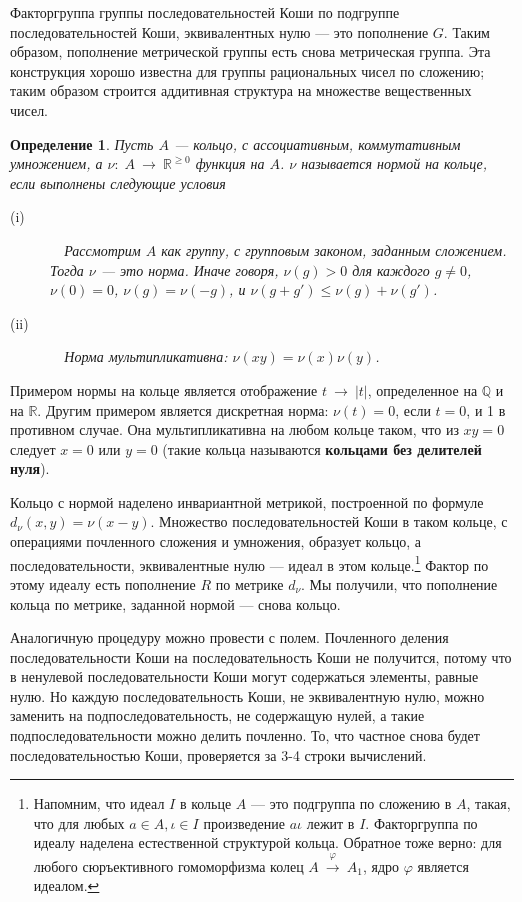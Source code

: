 \documentclass[12pt]{book}
\newcommand{\arrow}{{\:\longrightarrow\:}}
\renewcommand{\phi}{\varphi}
\def\R{{\mathbb R}}
\def\Q{{\mathbb Q}}
\theoremstyle{upshape}
\theoremstyle{generic}
\newtheorem{opredelenie}[teorema]{Определение}
\def\еза{\end{remark}}
\theoremstyle{upshapenonumber}
\newcommand{\следствие}{%
     \refstepcounter{teorema}
     {\noindent\bf Следствие \thechapter.\arabic{teorema}:\ }}
\newcommand{\пример}{%
     \refstepcounter{teorema}
     {\noindent\bf Пример \thechapter.\arabic{teorema}:\ }}
\newcommand{\лемма}{%
     \refstepcounter{teorema}
     {\noindent\bf Лемма \thechapter.\arabic{teorema}:\ }}
\newcommand{\теорема}{%
     \refstepcounter{teorema}
     {\noindent\bf Теорема \thechapter.\arabic{teorema}:\ }}
\newcommand{\утверждение}{%
     \refstepcounter{teorema}
     {\noindent\bf Утверждение \thechapter.\arabic{teorema}:\ }}
\def\бф{\bf}
\def\ем{\em}
\def\ез{\end{zadacha}}
\def\еу{\end{ukazanie}}
\def\определение{\begin{opredelenie}}
\def\ео{\end{opredelenie}}
\def\енум{\begin{enumerate}}
\def\ее{\end{enumerate}}
\begin{document}
Факторгруппа 
группы последовательностей Коши по 
подгруппе последовательностей Коши, эквивалентных
нулю --- это пополнение $G$. Таким образом, пополнение метрической
группы есть снова метрическая группа.
Эта конструкция хорошо известна для
группы рациональных чисел по 
сложению; таким образом строится
аддитивная структура на множестве
вещественных чисел.


\определение
Пусть $A$ --- кольцо, с ассоциативным, коммутативным
умножением, а $\nu:\; A \arrow \R^{\geq 0}$
функция на $A$. $\nu$ называется нормой на кольце, если выполнены
следующие условия
\begin{description}
\item[(i)]\ \ Рассмотрим $A$ как группу, с групповым
законом, заданным сложением. Тогда $\nu$ --- это норма.
Иначе говоря, $\nu(g)>0$ для каждого $g\neq 0$, $\nu(0)=0$, 
$\nu(g) = \nu(-g)$, и $\nu (g+g') \leq \nu(g) + \nu(g')$.
\item[(ii)] \ \ Норма мультипликативна: $\nu(xy) = \nu(x)\nu(y)$.
\end{description}
\ео

Примером нормы на кольце является
отображение $t \arrow |t|$, определенное
на $\Q$ и на $\R$. Другим примером является 
дискретная норма: $\nu(t) =0$, если $t=0$, и 1 в
противном случае. Она мультипликативна на любом
кольце таком, что из $xy =0$ следует $x=0$ или $y=0$
(такие кольца называются {\бф кольцами без делителей нуля}).

Кольцо с нормой наделено инвариантной метрикой,
построенной по формуле $d_\nu(x,y) = \nu(x-y)$.
Множество последовательностей Коши в таком кольце,
с операциями почленного сложения и умножения,
образует кольцо, а последовательности, эквивалентные
нулю --- идеал в этом кольце.\footnote{Напомним, что
идеал $I$ в кольце $A$ --- это подгруппа по сложению в $A$,
такая, что для любых $a\in A, \iota \in I$ произведение 
$a\iota$ лежит в $I$. Факторгруппа по идеалу наделена 
естественной структурой кольца. Обратное тоже верно:
для любого сюръективного гомоморфизма колец
$A\stackrel \phi\arrow A_1$, ядро $\phi$
является идеалом.} Фактор по этому идеалу
есть пополнение $R$ по метрике $d_\nu$.
Мы получили, что пополнение кольца по метрике,
заданной нормой --- снова кольцо. 

Аналогичную процедуру можно провести с полем.
Почленного деления последовательности Коши 
на последовательность Коши не получится, 
потому что в ненулевой последовательности
Коши могут содержаться элементы, равные нулю.
Но каждую последовательность Коши, не
эквивалентную нулю, можно заменить
на подпоследовательность, не содержащую
нулей, а такие подпоследовательности можно делить
почленно. То, что частное снова будет последовательностью
Коши, проверяется за 3-4 строки вычислений.
\end{document}
